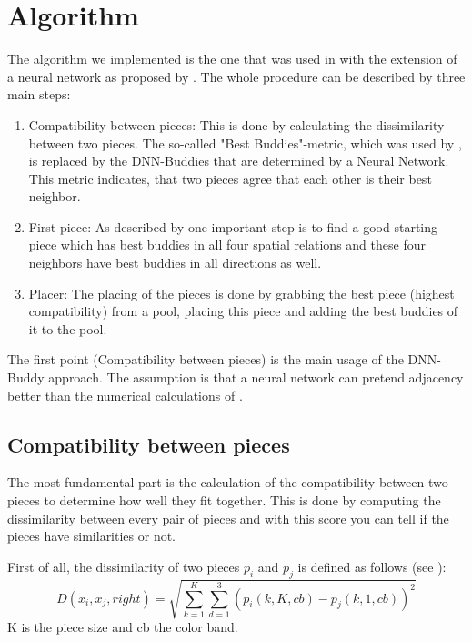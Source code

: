 \documentclass[11pt]{report}
\begin{document}
\section{Algorithm}
\label{sec:algo}
The algorithm we implemented is the one that was used in \cite{Paikin2015} with the extension of a neural network as proposed by \cite{sholomon2016dnn}. The whole procedure can be described by three main steps:
\begin{enumerate}
	\item Compatibility between pieces: This is done by calculating the dissimilarity between two pieces. The so-called "Best Buddies"-metric, which was used by \cite{Paikin2015}, is replaced by the DNN-Buddies that are determined by a Neural Network. This metric indicates, that two pieces agree that each other is their best neighbor.
	\item First piece: As described by \cite{Paikin2015} one important step is to find a good starting piece which has best buddies in all four spatial relations and these four neighbors have best buddies in all directions as well.
	\item Placer: The placing of the pieces is done by grabbing the best piece (highest compatibility) from a pool, placing this piece and adding the best buddies of it to the pool.
\end{enumerate}
The first point (Compatibility between pieces) is the main usage of the DNN-Buddy approach. The assumption is that a neural network can pretend adjacency better than the numerical calculations of \cite{Paikin2015}.

\subsection{Compatibility between pieces}
The most fundamental part is the calculation of the compatibility between two pieces to determine how well they fit together. This is done by computing the dissimilarity between every pair of pieces and with this score you can tell if the pieces have similarities or not.

First of all, the dissimilarity of two pieces $p_i$ and $p_j$ is defined as follows (see \cite{sholomon2016dnn}): 
\begin{equation}\label{eq:dissimilarity}
	D(x_i,x_j,right) = \sqrt{\sum_{k=1}^K \sum_{d=1}^3 (p_i(k,K,cb) - p_j(k,1,cb))^2}
\end{equation}
K is the piece size and cb the color band.
\end{document}

